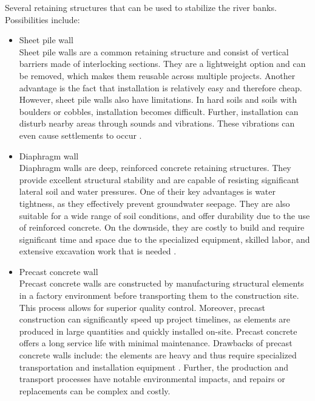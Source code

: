 Several retaining structures that can be used to stabilize the river banks. Possibilities include:
\begin{itemize}
    \item Sheet pile wall\\
    Sheet pile walls are a common retaining structure and consist of vertical barriers made of interlocking sections. They are a lightweight option and can be removed, which makes them reusable across multiple projects. Another advantage is the fact that installation is relatively easy and therefore cheap. However, sheet pile walls also have limitations. In hard soils and soils with boulders or cobbles, installation becomes difficult. Further, installation can disturb nearby areas through sounds and vibrations. These vibrations can even cause settlements to occur \autocite{korffReaderDeepExcavations2023}.

    \item Diaphragm wall\\
    Diaphragm walls are deep, reinforced concrete retaining structures. They provide excellent structural stability and are capable of resisting significant lateral soil and water pressures. One of their key advantages is water tightness, as they effectively prevent groundwater seepage. They are also suitable for a wide range of soil conditions, and offer durability due to the use of reinforced concrete. On the downside, they are costly to build and require significant time and space due to the specialized equipment, skilled labor, and extensive excavation work that is needed \autocite{korffReaderDeepExcavations2023}.
    
    \item Precast concrete wall\\
    Precast concrete walls are constructed by manufacturing structural elements in a factory environment before transporting them to the construction site. This process allows for superior quality control. Moreover, precast construction can significantly speed up project timelines, as elements are produced in large quantities and quickly installed on-site. Precast concrete offers a long service life with minimal maintenance. Drawbacks of precast concrete walls include: the elements are heavy and thus require specialized transportation and installation equipment \autocite{mcneilengineeringAdvantagesDisadvantagesUsing2023}. Further, the production and transport processes have notable environmental impacts, and repairs or replacements can be complex and costly.


\end{itemize}
